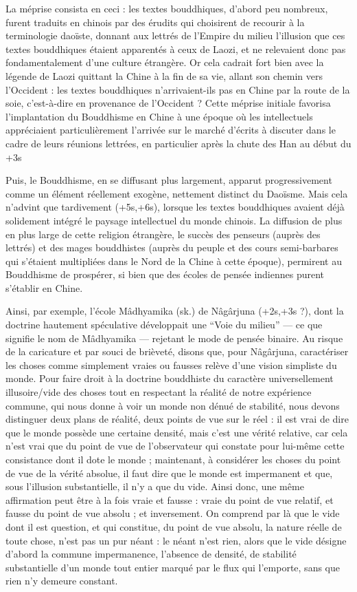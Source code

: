 La méprise consista en ceci : les textes bouddhiques, d'abord peu nombreux, furent traduits en chinois par des érudits qui choisirent de recourir à la terminologie daoïste,
donnant aux lettrés de l'Empire du milieu l'illusion que ces textes bouddhiques étaient
apparentés à ceux de Laozi, et ne relevaient donc pas fondamentalement d'une culture
étrangère.
Or cela cadrait fort bien avec la légende de Laozi quittant la Chine à la fin de
sa vie, allant son chemin vers l'Occident : les textes bouddhiques n'arrivaient-ils pas en
Chine par la route de la soie, c'est-à-dire en provenance de l'Occident ? Cette méprise
initiale favorisa l'implantation du Bouddhisme en Chine à une époque où les intellectuels appréciaient particulièrement l'arrivée sur le marché d'écrits à discuter dans le
cadre de leurs réunions lettrées, en particulier après la chute des Han au début du +3s

Puis, le Bouddhisme, en se diffusant plus largement, apparut progressivement comme
un élément réellement exogène, nettement distinct du Daoïsme.
Mais cela n'advint que
tardivement (+5s,+6s), lorsque les textes bouddhiques avaient déjà solidement
intégré le paysage intellectuel du monde chinois.
La diffusion de plus en plus large de
cette religion étrangère, le succès des penseurs (auprès des lettrés) et des mages bouddhistes (auprès du peuple et des cours semi-barbares qui s'étaient multipliées dans le
Nord de la Chine à cette époque), permirent au Bouddhisme de prospérer, si bien que
des écoles de pensée indiennes purent s'établir en Chine.

Ainsi, par exemple, l'école Mâdhyamika (sk.) de Nâgârjuna (+2s,+3s ?),
dont la doctrine hautement spéculative développait une ``Voie du milieu'' --- ce que signifie le nom de Mâdhyamika --- rejetant le mode de pensée binaire.
Au risque de la
caricature et par souci de brièveté, disons que, pour Nâgârjuna, caractériser les choses
comme simplement vraies ou fausses relève d'une vision simpliste du monde.
Pour faire droit à la doctrine bouddhiste du caractère universellement illusoire/vide des choses tout
en respectant la réalité de notre expérience commune, qui nous donne à voir un monde
non dénué de stabilité, nous devons distinguer deux plans de réalité, deux points de vue
sur le réel : il est vrai de dire que le monde possède une certaine densité, mais c'est une
vérité relative, car cela n'est vrai que du point de vue de l'observateur qui constate pour
lui-même cette consistance dont il dote le monde ; maintenant, à considérer les choses
du point de vue de la vérité absolue, il faut dire que le monde est impermanent et que,
sous l'illusion substantielle, il n'y a que du vide.
Ainsi donc, une même affirmation peut
être à la fois vraie et fausse : vraie du point de vue relatif, et fausse du point de vue absolu ; et inversement.
On comprend par là que le vide dont il est question, et qui
constitue, du point de vue absolu, la nature réelle de toute chose, n'est pas un pur néant :
le néant n'est rien, alors que le vide désigne d'abord la commune impermanence,
l'absence de densité, de stabilité substantielle d'un monde tout entier marqué par le flux
qui l'emporte, sans que rien n'y demeure constant.

